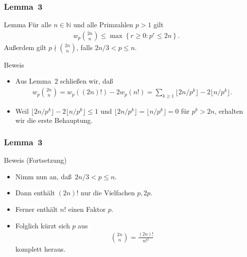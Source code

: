 \documentclass{beamer}
\newcommand\NN{\mathbb N}
\newcommand\cbc[1]{\left\{{#1}\right\}}
\renewcommand{\ae}{\"a}
\newcommand{\ue}{\"u}
\begin{document}
\begin{frame}\frametitle{Lemma~3}
	\begin{block}{Lemma}
		F\ue r alle $n\in\NN$ und alle Primzahlen $p>1$ gilt 
		\begin{align*}
			w_p\binom{2n}n\leq\max\cbc{r\geq0:p^r\leq2n}.
		\end{align*}
		Au\ss erdem gilt $p\nmid\binom{2n}n$, falls $2n/3<p\leq n$.
	\end{block}
	\begin{block}{Beweis}
		\begin{itemize}
			\item Aus Lemma~2 schlie\ss en wir, da\ss 
				\begin{align*}
					w_p\binom{2n}n=w_p((2n)!)-2w_p(n!)=\sum_{k\geq1}\lfloor 2n/p^k\rfloor-2\lfloor n/p^k\rfloor.
				\end{align*}
			\item Weil $\lfloor 2n/p^k\rfloor-2\lfloor n/p^k\rfloor\leq1$ und $\lfloor 2n/p^k\rfloor=\lfloor n/p^k\rfloor=0$ f\ue r $p^k>2n$, erhalten wir die erste Behauptung.
		\end{itemize}
	\end{block}
\end{frame}

\begin{frame}\frametitle{Lemma~3}
	\begin{block}{Beweis (Fortsetzung)}
		\begin{itemize}
			\item Nimm nun an, da\ss\ $2n/3<p\leq n$.
			\item Dann enth\ae lt $(2n)!$ nur die Vielfachen $p,2p$.
			\item Ferner enth\ae lt $n!$ einen Faktor $p$.
			\item Folglich k\ue rzt sich $p$ aus
				\begin{align*}
					\binom{2n}n=\frac{(2n)!}{n!^2}
				\end{align*}
				komplett heraus.
		\end{itemize}
	\end{block}
\end{frame}
\end{document}
